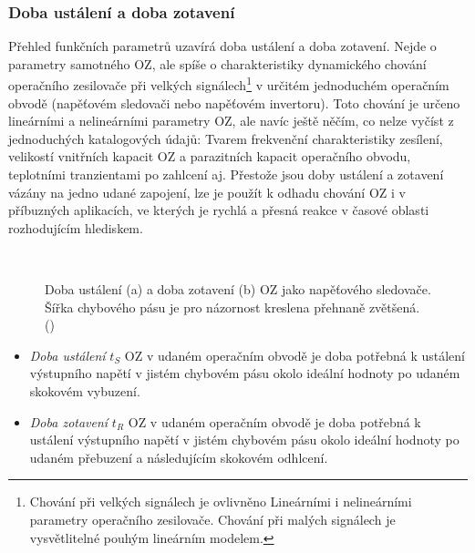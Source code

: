       \subsubsection{Doba ustálení a doba zotavení}\label{aesIchIIIsecIIssecVIII}
        Přehled funkčních parametrů uzavírá doba ustálení a doba zotavení. Nejde o parametry
        samotného OZ, ale spíše o charakteristiky dynamického chování operačního zesilovače při
        velkých signálech\footnote{Chování při velkých signálech je ovlivněno Lineárními i
        nelineárními parametry operačního zesilovače. Chování při malých signálech je vysvětlitelné
        pouhým lineárním modelem.} v určitém jednoduchém operačním obvodě (napěťovém sledovači nebo
        napěťovém invertoru). Toto chování je určeno lineárními a nelineárními parametry OZ, ale
        navíc ještě něčím, co nelze vyčíst z jednoduchých katalogových údajů: Tvarem frekvenční
        charakteristiky zesílení, velikostí vnitřních kapacit OZ a parazitních kapacit operačního
        obvodu, teplotními tranzientami po zahlcení aj. Přestože jsou doby ustálení a zotavení
        vázány na jedno udané zapojení, lze je použít k odhadu chování OZ i v příbuzných aplikacích,
        ve kterých je rychlá a přesná reakce v časové oblasti rozhodujícím hlediskem. 

        \begin{figure}[ht!]  %
          \centering
                \\                                              
          \caption{Doba ustálení (a) a doba zotavení (b) OZ jako napěťového sledovače. Šířka
                   chybového pásu je pro názornost kreslena přehnaně zvětšená.
                   (\cite[s.~32]{Dostal})}
          \label{aes:fig059}
        \end{figure}

        \begin{itemize}[noitemsep]
          \item \emph{Doba ustálení} \(t_S\) OZ v udaném operačním obvodě je doba potřebná k
                ustálení výstupního napětí v jistém chybovém pásu okolo ideální hodnoty po udaném
                skokovém vybuzení.    
          \item \emph{Doba zotavení} \(t_R\) OZ v udaném operačním obvodě je doba potřebná k
                ustálení výstupního napětí v jistém chybovém pásu okolo ideální hodnoty po udaném
                přebuzení a následujícím skokovém odhlcení.      
        \end{itemize}

